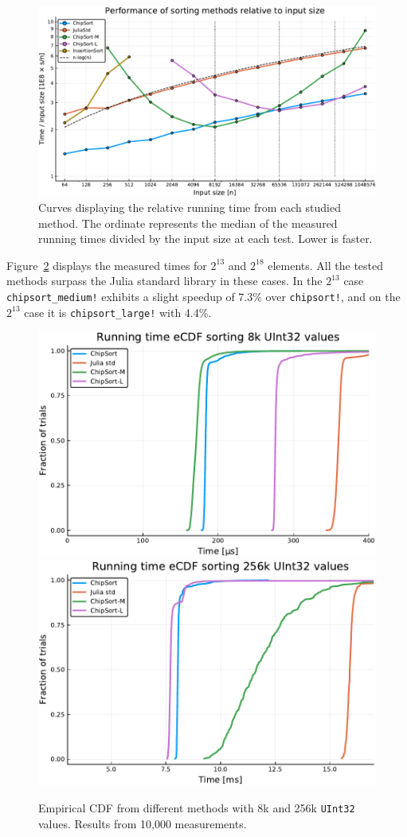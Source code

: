 \documentclass{juliacon}
\begin{document}
\begin{figure}[htb]
\centerline{\includegraphics[width=\linewidth]{fig/chipsort-bench-curves.pdf}}
\caption{Curves displaying the relative running time from each studied method. The ordinate represents the median of the measured running times divided by the input size at each test. Lower is faster.}
\label{fig:bench-curves}
\end{figure}

Figure~\ref{fig:bench-cdf} displays the measured times for $2^{13}$ and $2^{18}$ elements. All the tested \chipsort methods surpass the Julia standard library in these cases. In the $2^{13}$ case {\tt chipsort\_medium!} exhibits a slight speedup of 7.3\% over {\tt chipsort!}, and on the $2^{13}$ case it is {\tt chipsort\_large!} with 4.4\%.

\begin{figure}[htb]
  \centerline{\includegraphics[width=0.4\linewidth]{fig/chipsort-bench-8k.pdf}
    \includegraphics[width=0.4\linewidth]{fig/chipsort-bench-256k.pdf}}
\caption{Empirical CDF from different methods with 8k and 256k {\tt UInt32} values. Results from 10,000 measurements.}
\label{fig:bench-cdf}
\end{figure}
\end{document}
